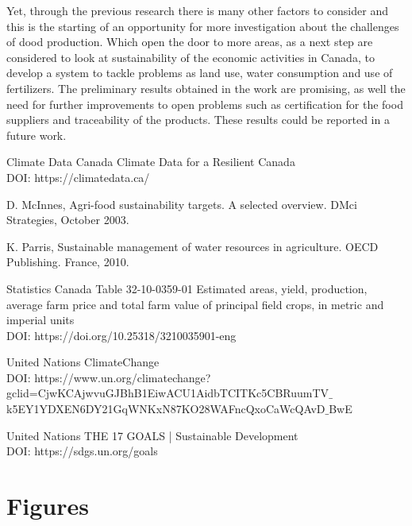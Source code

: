 \documentclass[11pt]{article}
\numberwithin{equation}{section}
\begin{document}
Yet, through the previous research  there is many other factors to consider and this is the starting of an opportunity for more investigation about the challenges of dood production. Which open the door to more areas, as a next step are considered to look at sustainability of the economic activities  in Canada, to develop a system to tackle problems as land use, water consumption and use of fertilizers. The preliminary results obtained in the work are promising, as well the need for further improvements to open  problems such as certification for the food suppliers and traceability of the products. These results could be reported in a future work.


\begin{thebibliography}{99}

{\sc Climate Data Canada}
Climate Data for a Resilient Canada \\
{\sc DOI:} https://climatedata.ca/

{\sc D. McInnes},
Agri-food sustainability targets. A selected overview. DMci Strategies, October 2003.

{\sc K. Parris},
Sustainable management of water resources in agriculture. OECD Publishing. France, 2010.

{\sc Statistics Canada}
Table 32-10-0359-01  Estimated areas, yield, production, average farm price and total farm value of principal field crops, in metric and imperial units \\
{\sc DOI:}  https://doi.org/10.25318/3210035901-eng

{\sc United Nations}
ClimateChange \\
{\sc DOI:} https://www.un.org/climatechange?gclid=CjwKCAjwvuGJBhB1EiwACU1AidbTCITKc5CBRuumTV$\_$k5EY1YDXEN6DY21GqWNKxN87KO28WAFncQxoCaWcQAvD$\_$BwE

{\sc United Nations}
THE 17 GOALS | Sustainable Development \\
{\sc DOI:} https://sdgs.un.org/goals

\end{thebibliography}

\section*{Figures}\label{figures}
\end{document}
